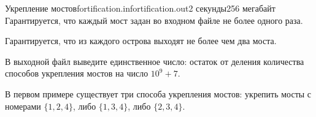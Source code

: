 \begin{problem}{Укрепление мостов}{fortification.in}{fortification.out}{2 секунды}{256 мегабайт}
Гарантируется, что каждый мост задан во входном файле не более одного раза.

Гарантируется, что из каждого острова выходят не более чем два моста.

\OutputFile

В выходной файл выведите единственное число: остаток от деления количества 
способов укрепления мостов на число $10^9+7$.

\Examples

\begin{example}%
%
%       
\end{example}

\Note

В первом примере существует три способа укрепления мостов: укрепить мосты с номерами $\lbrace 1, 2, 4 \rbrace$, 
либо $\lbrace 1, 3, 4 \rbrace$, либо $\lbrace 2, 3, 4 \rbrace$.

\end{problem}
